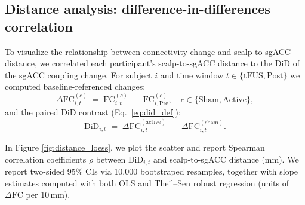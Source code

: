 \subsection*{Distance analysis: difference-in-differences correlation}
\noindent
To visualize the relationship between connectivity change and scalp-to-sgACC distance, we correlated each participant’s scalp-to-sgACC distance to the DiD of the sgACC coupling change. For subject $i$ and time window $t \in \{\text{tFUS},\text{Post}\}$ we computed baseline-referenced changes:
\begin{equation}
\label{eq:delta_fc_did}
\Delta\mathrm{FC}^{(c)}_{i,t} \;=\; \mathrm{FC}^{(c)}_{i,t} \;-\; \mathrm{FC}^{(c)}_{i,\mathrm{Pre}},
\quad c \in \{\text{Sham}, \text{Active}\},
\end{equation}
and the paired DiD contrast (Eq.~\eqref{eq:did_def}):
\begin{equation}
\label{eq:did_def}
\mathrm{DiD}_{i,t} \;=\; \Delta\mathrm{FC}^{(\text{active})}_{i,t} \;-\; \Delta\mathrm{FC}^{(\text{sham})}_{i,t}.
\end{equation}

In Figure \ref{fig:distance_loess}, we plot the scatter and report Spearman correlation coefficients $\rho$ between $\mathrm{DiD}_{i,t}$ and scalp-to-sgACC distance (mm). We report two-sided 95\% CIs via 10,000 bootstraped resamples, together with slope estimates computed with both OLS and Theil–Sen robust regression (units of $\Delta\mathrm{FC}$ per 10\,mm). 



